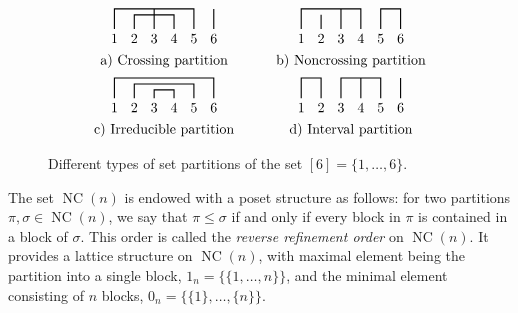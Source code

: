 \documentclass[11pt]{article}
\numberwithin{equation}{section}
\numberwithin{equation}{section}
\newcommand{\NC}{\operatorname{NC}}
\begin{document}
\begin{figure}[t]
$$
\begin{array}{c c c}
\begin{tikzpicture}[thick,font=\small]
 \path 	(0,0) 		node (a) {1}
 	(0.5,0) 	node (b) {2}
 	(1,0) 		node (c) {3}
 	(1.5,0) 	node (d) {4}
 	(2,0) 		node (e) {5}
	(2.5,0) 		node (f) {6};
 \draw (a) -- +(0,0.75) -| (e);
 \draw (b) -- +(0,0.60) -| (d);
 \draw (c) -- +(0,0.75) -| (c);
 \draw (f) -- +(0,0.75) -| (f);
 \end{tikzpicture}
 & \quad &
 \begin{tikzpicture}[thick,font=\small]
 \path 	(0,0) 		node (a) {1}
 	(0.5,0) 	node (b) {2}
 	(1,0) 		node (c) {3}
 	(1.5,0) 	node (d) {4}
 	(2,0) 		node (e) {5}
 	(2.5,0) 	node (f) {6};
 \draw (a) -- +(0,0.75) -| (d);
 \draw (c) -- +(0,0.75) -| (c);
 \draw (b) -- +(0,0.60) -| (b);
 \draw (e) -- +(0,0.75) -| (f);
 \end{tikzpicture}\\
 \mbox{a) Crossing partition}& \quad & \mbox{b) Noncrossing partition}\\[0.2cm]
 \begin{tikzpicture}[thick,font=\small]
 \path 	(0,0) 		node (a) {1}
 	(0.5,0) 	node (b) {2}
 	(1,0) 		node (c) {3}
 	(1.5,0) 	node (d) {4}
 	(2,0) 		node (e) {5}
 	(2.5,0) 	node (f) {6};
 \draw (a) -- +(0,0.75) -| (f);
 \draw (b) -- +(0,0.60) -| (e);
 \draw (c) -- +(0,0.45) -| (d);
 \end{tikzpicture}
 & \quad &
 \begin{tikzpicture}[thick,font=\small]
 \path 	(0,0) 		node (a) {1}
 	(0.5,0) 	node (b) {2}
 	(1,0) 		node (c) {3}
 	(1.5,0) 	node (d) {4}
 	(2,0) 		node (e) {5}
 	(2.5,0) 	node (f) {6};
 \draw (a) -- +(0,0.75) -| (b);
 \draw (c) -- +(0,0.75) -| (e);
 \draw (d) -- +(0,0.75) -| (d);
 \draw (f) -- +(0,0.75) -| (f);
 \end{tikzpicture}
 \\ \mbox{c) Irreducible partition} &\quad &\mbox{d) Interval partition}
\end{array}
$$
\caption{Different types of set partitions of the set $[6]=\{1,\dots,6\}$.}
\end{figure}

The set $\NC(n)$ is endowed with a poset structure as follows: for two partitions $\pi,\sigma \in \NC(n)$, we say that $\pi \leq \sigma$ if and only if every block in $\pi$ is contained in a block of $\sigma$. This order is called the \textit{reverse refinement order} on $\NC(n)$. It provides a lattice structure on $\NC(n)$, with maximal element being the partition into a single block, $1_n = \{\{1,\dots,n\}\}$, and the minimal element consisting of $n$ blocks, $0_n = \{ \{1\},\dots, \{n\}\}$.
\end{document}
